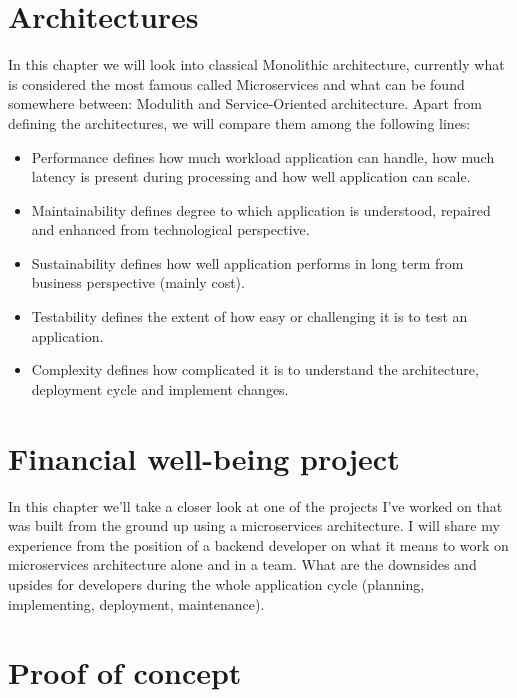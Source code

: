 \chapter{Architectures}
\label{chapter:architectures}
In this chapter we will look into classical Monolithic architecture, currently what is considered the most famous called Microservices and what can be found somewhere between: Modulith and Service-Oriented architecture. Apart from defining the architectures, we will compare them among the following lines:
\begin{itemize}
    \item Performance defines how much workload application can handle, how much latency is present during processing and how well application can scale.
    \item Maintainability defines degree to which application is understood, repaired and enhanced from technological perspective.  \cite{SOFTWARE_MAINTAINABILITY}
    \item Sustainability defines how well application performs in long term from business perspective (mainly cost).
    \item Testability defines the extent of how easy or challenging it is to test an application.
    \item Complexity defines how complicated it is to understand the architecture, deployment cycle and implement changes.
\end{itemize}







\chapter{Financial well-being project}
\label{chapter:personal_experience}
In this chapter we'll take a closer look at one of the projects I've worked on that was built from the ground up using a microservices architecture. I will share my experience from the position of a backend developer on what it means to work on microservices architecture alone and in a team. What are the downsides and upsides for developers during the whole application cycle (planning, implementing, deployment, maintenance).



\chapter{Proof of concept}
\label{chapter:example_application}



